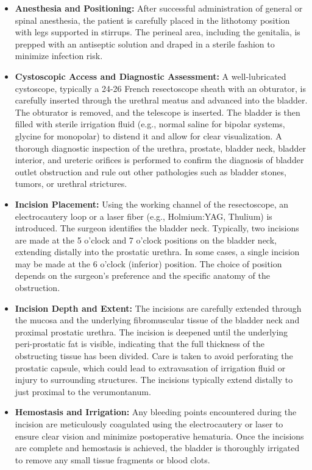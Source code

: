 \begin{itemize}
  \item \textbf{Anesthesia and Positioning:} After successful administration of general or spinal anesthesia, the patient is carefully placed in the lithotomy position with legs supported in stirrups. The perineal area, including the genitalia, is prepped with an antiseptic solution and draped in a sterile fashion to minimize infection risk.
  
  \item \textbf{Cystoscopic Access and Diagnostic Assessment:} A well-lubricated cystoscope, typically a 24-26 French resectoscope sheath with an obturator, is carefully inserted through the urethral meatus and advanced into the bladder. The obturator is removed, and the telescope is inserted. The bladder is then filled with sterile irrigation fluid (e.g., normal saline for bipolar systems, glycine for monopolar) to distend it and allow for clear visualization. A thorough diagnostic inspection of the urethra, prostate, bladder neck, bladder interior, and ureteric orifices is performed to confirm the diagnosis of bladder outlet obstruction and rule out other pathologies such as bladder stones, tumors, or urethral strictures.
  
  \item \textbf{Incision Placement:} Using the working channel of the resectoscope, an electrocautery loop or a laser fiber (e.g., Holmium:YAG, Thulium) is introduced. The surgeon identifies the bladder neck. Typically, two incisions are made at the 5 o'clock and 7 o'clock positions on the bladder neck, extending distally into the prostatic urethra. In some cases, a single incision may be made at the 6 o'clock (inferior) position. The choice of position depends on the surgeon's preference and the specific anatomy of the obstruction.
  
  \item \textbf{Incision Depth and Extent:} The incisions are carefully extended through the mucosa and the underlying fibromuscular tissue of the bladder neck and proximal prostatic urethra. The incision is deepened until the underlying peri-prostatic fat is visible, indicating that the full thickness of the obstructing tissue has been divided. Care is taken to avoid perforating the prostatic capsule, which could lead to extravasation of irrigation fluid or injury to surrounding structures. The incisions typically extend distally to just proximal to the verumontanum.
  
  \item \textbf{Hemostasis and Irrigation:} Any bleeding points encountered during the incision are meticulously coagulated using the electrocautery or laser to ensure clear vision and minimize postoperative hematuria. Once the incisions are complete and hemostasis is achieved, the bladder is thoroughly irrigated to remove any small tissue fragments or blood clots.
  

\end{itemize}
